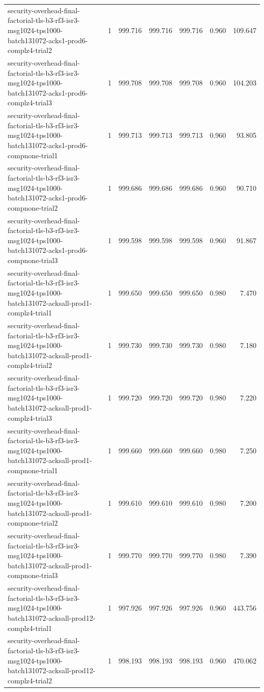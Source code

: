 \begin{tabular}{lrrrrrr}
security-overhead-final-factorial-tls-b3-rf3-isr3-msg1024-tps1000-batch131072-acks1-prod6-complz4-trial2 & 1 & 999.716 & 999.716 & 999.716 & 0.960 & 109.647 \\
security-overhead-final-factorial-tls-b3-rf3-isr3-msg1024-tps1000-batch131072-acks1-prod6-complz4-trial3 & 1 & 999.708 & 999.708 & 999.708 & 0.960 & 104.203 \\
security-overhead-final-factorial-tls-b3-rf3-isr3-msg1024-tps1000-batch131072-acks1-prod6-compnone-trial1 & 1 & 999.713 & 999.713 & 999.713 & 0.960 & 93.805 \\
security-overhead-final-factorial-tls-b3-rf3-isr3-msg1024-tps1000-batch131072-acks1-prod6-compnone-trial2 & 1 & 999.686 & 999.686 & 999.686 & 0.960 & 90.710 \\
security-overhead-final-factorial-tls-b3-rf3-isr3-msg1024-tps1000-batch131072-acks1-prod6-compnone-trial3 & 1 & 999.598 & 999.598 & 999.598 & 0.960 & 91.867 \\
security-overhead-final-factorial-tls-b3-rf3-isr3-msg1024-tps1000-batch131072-acksall-prod1-complz4-trial1 & 1 & 999.650 & 999.650 & 999.650 & 0.980 & 7.470 \\
security-overhead-final-factorial-tls-b3-rf3-isr3-msg1024-tps1000-batch131072-acksall-prod1-complz4-trial2 & 1 & 999.730 & 999.730 & 999.730 & 0.980 & 7.180 \\
security-overhead-final-factorial-tls-b3-rf3-isr3-msg1024-tps1000-batch131072-acksall-prod1-complz4-trial3 & 1 & 999.720 & 999.720 & 999.720 & 0.980 & 7.220 \\
security-overhead-final-factorial-tls-b3-rf3-isr3-msg1024-tps1000-batch131072-acksall-prod1-compnone-trial1 & 1 & 999.660 & 999.660 & 999.660 & 0.980 & 7.250 \\
security-overhead-final-factorial-tls-b3-rf3-isr3-msg1024-tps1000-batch131072-acksall-prod1-compnone-trial2 & 1 & 999.610 & 999.610 & 999.610 & 0.980 & 7.200 \\
security-overhead-final-factorial-tls-b3-rf3-isr3-msg1024-tps1000-batch131072-acksall-prod1-compnone-trial3 & 1 & 999.770 & 999.770 & 999.770 & 0.980 & 7.390 \\
security-overhead-final-factorial-tls-b3-rf3-isr3-msg1024-tps1000-batch131072-acksall-prod12-complz4-trial1 & 1 & 997.926 & 997.926 & 997.926 & 0.960 & 443.756 \\
security-overhead-final-factorial-tls-b3-rf3-isr3-msg1024-tps1000-batch131072-acksall-prod12-complz4-trial2 & 1 & 998.193 & 998.193 & 998.193 & 0.960 & 470.062 \\

\end{tabular}

